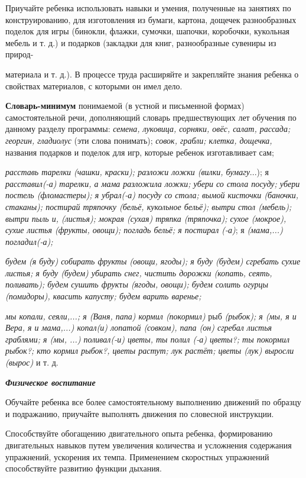 \documentclass{book}
\renewcommand{\emph}[1]{\textit{#1}}
\begin{document}
Приучайте ребенка использовать навыки и умения, полученные на занятиях
по конструированию, для изготовления из бумаги, картона, дощечек
разнообразных поделок для игры (бинокли, флажки, сумочки, шапочки,
коробочки, кукольная мебель и т. д.) и подарков (закладки для книг,
разнообразные сувениры из природ-

материала и т. д.). В процессе труда расширяйте и закрепляйте знания
ребенка о свойствах материалов, с которыми он имел дело.

\textbf{Словарь-минимум} понимаемой (в устной и письменной формах)
самостоятельной речи, дополняющий словарь предшествующих лет обучения по
данному разделу программы: \emph{семена, луковица, сорняки, овёс, салат,
рассада; георгин, гладиолус} (эти слова понимать); \emph{совок, грабли;
клетка, дощечка,} названия подарков и поделок для игр, которые ребенок
изготавливает сам;

\emph{расставь тарелки (чашки, краски); разложи ложки (вилки,
бумагу}...); я \emph{расставил(-а) тарелки, а мама разложила ложки;
убери со стола посуду; убери постель (фломастеры); я убрал(-а) посуду со
стола; вымой кисточки (баночки, стаканы); постирай тряпочку (бельё,
кукольное бельё); вытри стол (мебель); вытри пыль и, (листья); мокрая
(сухая) тряпка (тряпочка); сухое (мокрое), сухие листья (фрукты, овощи);
погладь бельё; я постирал (-а)}; я \emph{(мама,...) погладил(-а);}

\emph{будем (я буду) собирать фрукты (овощи, ягоды); я буду (будем)
сгребать сухие листья; я буду (будем) убирать снег, чистить дорожки
(копать, сеять, поливать); будем сушить фрук}т\emph{ы (ягоды, овощи);
будем солить огурцы (помидоры), квасить капусту; будем варить варенье;}

\emph{мы копали, сеяли,...; я (Ваня, папа) кормил (покормил)} рыб
\emph{(рыбок); я (мы, я и Вера, я и мама,...) копал(и) лопатой (совком),
папа (он) сгребал листья граблями; я (мы, ...) поливал(-и) цветы, ты
полил (-а) цветы?; ты покормил рыбок?; кто кормил рыбок?, цветы растут;
лук растёт; цветы (лук) выросли (вырос)} и т. д.

\emph{\textbf{Физическое воспитание}}

Обучайте ребенка все более самостоятельному выполнению движений по
образцу и подражанию, приучайте выполнять движения по словесной
инструкции.

Способствуйте обогащению двигательного опыта ребенка, формированию
двигательных навыков путем увеличения количества и усложнения содержания
упражнений, ускорения их темпа. Применением скоростных упражнений
способствуйте развитию функции дыхания.
\end{document}
